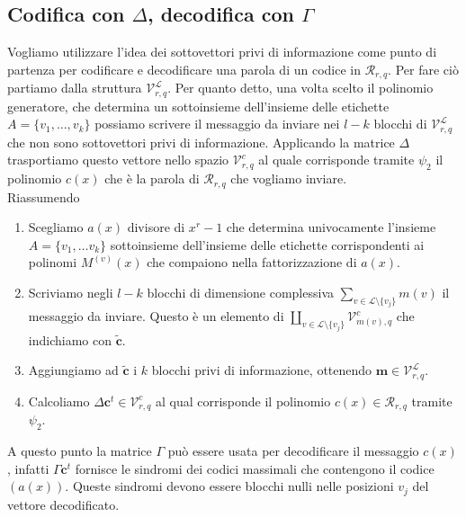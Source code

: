 \subsection{Codifica con $\Delta$, decodifica con $\Gamma$}
Vogliamo utilizzare l'idea dei sottovettori privi di informazione come punto di partenza per codificare e decodificare una parola di un codice in $\mathcal{R}_{r,q}$. Per fare ciò partiamo dalla struttura $\mathcal{V}_{r, q}^{\mathscr{L}}$. Per quanto detto, una volta scelto il polinomio generatore, che determina un sottoinsieme dell'insieme delle etichette $A = \lbrace v_{1}, \dots , v_{k} \rbrace $ possiamo scrivere il messaggio da inviare nei $l-k$ blocchi di $\mathcal{V}_{r, q}^{\mathscr{L}}$ che non sono sottovettori privi di informazione. Applicando la matrice $\Delta$ trasportiamo questo vettore nello spazio $\mathcal{V}_{r, q}^{c}$ al quale corrisponde tramite $\psi_{2}$ il polinomio $c(x)$ che è la parola di $\mathcal{R}_{r,q}$ che vogliamo inviare. \\
Riassumendo
\begin{enumerate}
   \item Scegliamo $a(x)$ divisore di $x^r - 1$ che determina univocamente l'insieme $A=\lbrace v_{1}, \dots v_{k} \rbrace$ sottoinsieme dell'insieme delle etichette corrispondenti ai polinomi $M^{(v)}(x)$ che compaiono nella fattorizzazione di $a(x)$.
   \item Scriviamo negli $l-k$ blocchi di dimensione complessiva $\sum_{v\in \mathscr{L} \setminus \lbrace v_{j}\rbrace} m(v)$ il messaggio da inviare. Questo è un elemento di $\coprod_{v\in \mathscr{L} \setminus \lbrace v_{j}\rbrace} \mathcal{V}_{m(v), q}^{c}$ che indichiamo con $\tilde{\mathbf{c}}$.
   \item Aggiungiamo ad $\tilde{\mathbf{c}} $ i $k$ blocchi privi di informazione, ottenendo $\mathbf{m} \in \mathcal{V}_{r, q}^{\mathscr{L}} $.
   \item Calcoliamo $\Delta \mathbf{c}^{t} \in \mathcal{V}_{r, q}^{c}$ al qual corrisponde il polinomio  $c(x) \in \mathcal{R}_{r,q}$ tramite $\psi_{2}$.
\end{enumerate}
A questo punto la matrice $\Gamma$ può essere usata per decodificare il messaggio $c(x)$, infatti $\Gamma \mathbf{c}^{t} $ fornisce le sindromi dei codici massimali che contengono il codice $(a(x))$. Queste sindromi devono essere blocchi nulli nelle posizioni $v_{j}$ del vettore decodificato.











